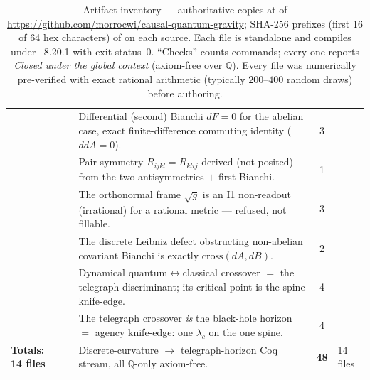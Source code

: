 \begin{table}[t]
{\begin{tabularx}{\textwidth}{@{}p{3.15cm}l Y c l@{}}
 & \Thq{} & Differential (second) Bianchi $dF=0$ for the abelian case, exact finite-difference commuting identity ($ddA=0$). & 3 &  \\
 & \Thq{} & Pair symmetry $R_{ijkl}=R_{klij}$ derived (not posited) from the two antisymmetries $+$ first Bianchi. & 1 &  \\
 & \Thq{} & The orthonormal frame $\sqrt{g}$ is an I1 non-readout (irrational) for a rational metric --- refused, not fillable. & 3 &  \\
 & \Thq{} & The discrete Leibniz defect obstructing non-abelian covariant Bianchi is exactly $\mathrm{cross}(dA,dB)$. & 2 &  \\
 & \Thq{} & Dynamical quantum$\leftrightarrow$classical crossover $=$ the telegraph discriminant; its critical point is the spine knife-edge. & 4 &  \\
 & \Thq{} & The telegraph crossover \emph{is} the black-hole horizon $=$ agency knife-edge: one $\lambda_c$ on the one spine. & 4 &  \\
\midrule
\textbf{Totals: 14 files} & \Thq{} & Discrete-curvature $\to$ telegraph-horizon Coq stream, all $\mathbb{Q}$-only axiom-free. & \textbf{48} & 14 files \\
\bottomrule
\end{tabularx}}
\caption{Artifact inventory --- authoritative copies at  of
\url{https://github.com/morrocwi/causal-quantum-gravity}; SHA-256 prefixes (first 16 of 64 hex
characters) of  on each  source. Each file is standalone and
compiles under ~8.20.1 with exit status~0. ``Checks'' counts 
commands; every one reports \emph{Closed under the global context} (axiom-free over $\mathbb{Q}$).
Every file was numerically pre-verified with exact rational arithmetic (typically $200$--$400$
random draws) before authoring.}
\label{tab:artifacts}
\end{table}
